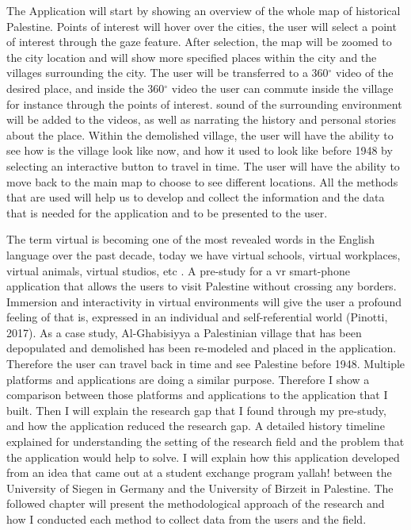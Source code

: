 The Application will start by showing an overview of the whole map of historical Palestine. Points of interest will hover over the cities, the user will select a point of interest through the gaze feature. After selection, the map will be zoomed to the city location and will show more specified places within the city and the villages surrounding the city. The user will be transferred to a 360$^{\circ}$ video of the desired place, and inside the 360$^{\circ}$ video the user can commute inside the village for instance through the points of interest. sound of the surrounding environment will be added to the videos, as well as narrating the history and personal stories about the place. Within the demolished village, the user will have the ability to see how is the village look like now, and how it used to look like before 1948 by selecting an interactive button to travel in time. The user will have the ability to move back to the main map to choose to see different locations. All the methods that are used will help us to develop and collect the information and the data that is needed for the application and to be presented to the user.




The term virtual is becoming one of the most revealed words in the English language over the past decade, today we have virtual schools, virtual workplaces, virtual animals, virtual studios, etc \citep{Vince2011}.
A pre-study for a \acrfull{vr} smart-phone application that allows the users to visit Palestine without crossing any borders. Immersion and interactivity in virtual environments will give the user a profound feeling of  that is, expressed in an individual and self-referential world (Pinotti, 2017). As a case study, Al-Ghabisiyya a Palestinian village that has been depopulated and demolished has been re-modeled and placed in the application. Therefore the user can travel back in time and see Palestine before 1948. Multiple platforms and applications are doing a similar purpose. Therefore I show a comparison between those platforms and applications to the application that I built. Then I will explain the research gap that I found through my pre-study, and how the application reduced the research gap. A detailed history timeline explained for understanding the setting of the research field and the problem that the application would help to solve. I will explain how this application developed from an idea that came out at a student exchange program \acrfull{yallah!} between the University of Siegen in Germany and the University of Birzeit in Palestine. The followed chapter will present the methodological approach of the research and how I conducted each method to collect data from the users and the field.  

